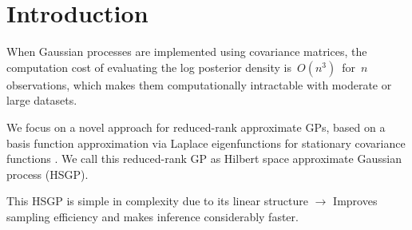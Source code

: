 \documentclass[landscape,a1,final]{a0poster} %
\let\tempone\itemize
\let\temptwo\enditemize
\renewenvironment{itemize}{\tempone\addtolength{\itemsep}{-0.3\baselineskip}}{\temptwo}
\begin{document}
\begin{minipage}{1\linewidth} 
\centering
\hspace{3pt}
\begin{minipage}[t]{0.30\linewidth}
\vspace{0pt}
\setlength{\parindent}{10mm} %



\vspace{0.8cm}
\section{Introduction}
\vspace{-0.2cm}

\begin{itemize}
	\setlength{\itemsep}{3mm}
	\item When Gaussian processes are implemented using covariance matrices, the computation cost of evaluating the log posterior density is\, $O(n^3)$\, for\, $n$\, observations, which makes them computationally intractable with moderate or large datasets.
	\item We focus on a novel approach for reduced-rank approximate GPs, based on a basis function approximation via Laplace eigenfunctions
for stationary covariance functions \href{https://arxiv.org/abs/1401.5508}{\citep{solin2018hilbert}}. We call this reduced-rank GP as {\color{navyblue} Hilbert space approximate Gaussian process} (HSGP).
	\item This HSGP is simple in complexity due to its linear structure\; $\to$\; Improves sampling efficiency and makes inference considerably faster.
	

\end{itemize}


\end{minipage}
\end{minipage}
\end{document}
